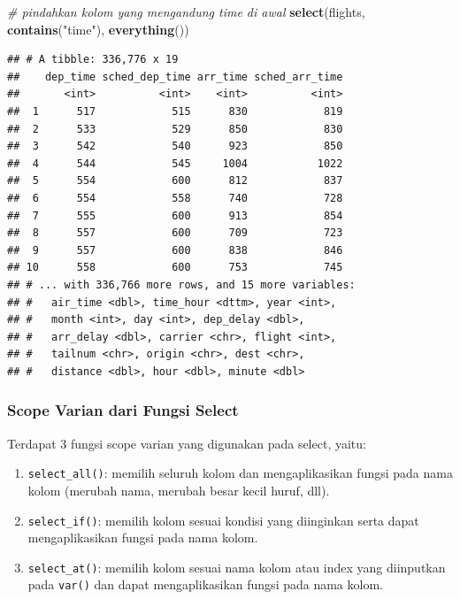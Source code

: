 \documentclass[]{book}
\newenvironment{Shaded}{\begin{snugshade}}{\end{snugshade}}
\newcommand{\KeywordTok}[1]{\textcolor[rgb]{0.13,0.29,0.53}{\textbf{#1}}}
\newcommand{\StringTok}[1]{\textcolor[rgb]{0.31,0.60,0.02}{#1}}
\newcommand{\CommentTok}[1]{\textcolor[rgb]{0.56,0.35,0.01}{\textit{#1}}}
\newcommand{\NormalTok}[1]{#1}
\providecommand{\tightlist}{%
  \setlength{\itemsep}{0pt}\setlength{\parskip}{0pt}}
\begin{document}
\begin{Shaded}
\begin{Highlighting}[]
\CommentTok{# pindahkan kolom yang mengandung time di awal}
\KeywordTok{select}\NormalTok{(flights, }\KeywordTok{contains}\NormalTok{(}\StringTok{"time"}\NormalTok{), }\KeywordTok{everything}\NormalTok{())}
\end{Highlighting}
\end{Shaded}

\begin{verbatim}
## # A tibble: 336,776 x 19
##    dep_time sched_dep_time arr_time sched_arr_time
##       <int>          <int>    <int>          <int>
##  1      517            515      830            819
##  2      533            529      850            830
##  3      542            540      923            850
##  4      544            545     1004           1022
##  5      554            600      812            837
##  6      554            558      740            728
##  7      555            600      913            854
##  8      557            600      709            723
##  9      557            600      838            846
## 10      558            600      753            745
## # ... with 336,766 more rows, and 15 more variables:
## #   air_time <dbl>, time_hour <dttm>, year <int>,
## #   month <int>, day <int>, dep_delay <dbl>,
## #   arr_delay <dbl>, carrier <chr>, flight <int>,
## #   tailnum <chr>, origin <chr>, dest <chr>,
## #   distance <dbl>, hour <dbl>, minute <dbl>
\end{verbatim}

\subsubsection{Scope Varian dari Fungsi
Select}\label{scope-varian-dari-fungsi-select}

Terdapat 3 fungsi scope varian yang digunakan pada select, yaitu:

\begin{enumerate}
\def\labelenumi{\arabic{enumi}.}
\tightlist
\item
  \texttt{select\_all()}: memilih seluruh kolom dan mengaplikasikan
  fungsi pada nama kolom (merubah nama, merubah besar kecil huruf, dll).
\item
  \texttt{select\_if()}: memilih kolom sesuai kondisi yang diinginkan
  serta dapat mengaplikasikan fungsi pada nama kolom.
\item
  \texttt{select\_at()}: memilih kolom sesuai nama kolom atau index yang
  diinputkan pada \texttt{var()} dan dapat mengaplikasikan fungsi pada
  nama kolom.
\end{enumerate}
\end{document}
